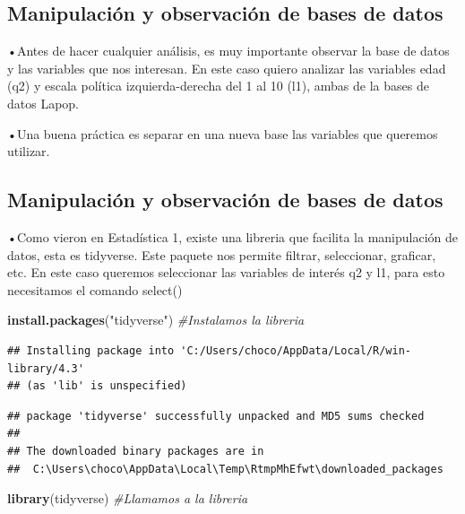 \documentclass[
]{article}
\newenvironment{Shaded}{\begin{snugshade}}{\end{snugshade}}
\newcommand{\CommentTok}[1]{\textcolor[rgb]{0.56,0.35,0.01}{\textit{#1}}}
\newcommand{\FunctionTok}[1]{\textcolor[rgb]{0.13,0.29,0.53}{\textbf{#1}}}
\newcommand{\NormalTok}[1]{#1}
\newcommand{\StringTok}[1]{\textcolor[rgb]{0.31,0.60,0.02}{#1}}
\begin{document}
\subsection{Manipulación y observación de bases de
datos}\label{manipulaciuxf3n-y-observaciuxf3n-de-bases-de-datos}

•Antes de hacer cualquier análisis, es muy importante observar la base
de datos y las variables que nos interesan. En este caso quiero analizar
las variables edad (q2) y escala política izquierda-derecha del 1 al 10
(l1), ambas de la bases de datos Lapop.

•Una buena práctica es separar en una nueva base las variables que
queremos utilizar.

\subsection{Manipulación y observación de bases de
datos}\label{manipulaciuxf3n-y-observaciuxf3n-de-bases-de-datos-1}

•Como vieron en Estadística 1, existe una libreria que facilita la
manipulación de datos, esta es tidyverse. Este paquete nos permite
filtrar, seleccionar, graficar, etc. En este caso queremos seleccionar
las variables de interés q2 y l1, para esto necesitamos el comando
select()

\begin{Shaded}
\begin{Highlighting}[]
\FunctionTok{install.packages}\NormalTok{(}\StringTok{"tidyverse"}\NormalTok{) }\CommentTok{\#Instalamos la libreria}
\end{Highlighting}
\end{Shaded}

\begin{verbatim}
## Installing package into 'C:/Users/choco/AppData/Local/R/win-library/4.3'
## (as 'lib' is unspecified)
\end{verbatim}

\begin{verbatim}
## package 'tidyverse' successfully unpacked and MD5 sums checked
## 
## The downloaded binary packages are in
##  C:\Users\choco\AppData\Local\Temp\RtmpMhEfwt\downloaded_packages
\end{verbatim}

\begin{Shaded}
\begin{Highlighting}[]
\FunctionTok{library}\NormalTok{(tidyverse) }\CommentTok{\#Llamamos a la libreria}
\end{Highlighting}
\end{Shaded}
\end{document}
